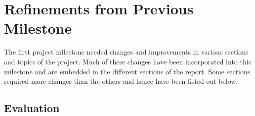\section{Refinements from Previous Milestone} 
\label{sec:research}

The first project milestone needed changes and improvements in various sections and topics of the project. Much of these changes have been incorporated into this milestone and are embedded in the different sections of the report. Some sections required more changes than the others and hence have been listed out below.

\subsection{Evaluation}
\label{sec:evaluation}

